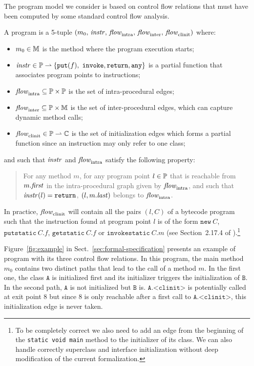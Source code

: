 \documentclass{entcs}
\newcommand{\clinit}{\ensuremath{\texttt{<clinit>}}}
\newcommand{\flow}{\mathit{flow}}
\newcommand{\intraflow}{\flow_{\rm intra}}
\newcommand{\interflow}{\flow_{\rm inter}}
\newcommand{\clinitflow}{\flow_{\rm clinit}}
\begin{document}
The program model we consider is based on control flow relations that
must have been computed by some standard control flow analysis.
\begin{definition}\sloppy
  A program is a 5-tuple
  $(m_0,\,\instrAt,\,\intraflow,\,\interflow,\,\clinitflow)$ where:
  \begin{itemize}
  \item $m_0\in\mathbb{M}$ is the method where the program execution
    starts;
  \item $\mathit{instr}\in\mathbb{P}\rightharpoonup\{\mathtt{put}(f),~\mathtt{invoke},\mathtt{return},\mathtt{any}\}$ is a
    partial function that associates program points to instructions;
  \item $\intraflow\subseteq \ppt\times\ppt$ is the set of
    intra-procedural edges;
  \item $\interflow\subseteq \ppt\times\method$ is the set of
    inter-procedural edges, which can capture dynamic method calls;
  \item $\clinitflow\in \ppt\pto\class$ is the set of initialization
    edges which forms a partial function since an instruction may only
    refer to one class;
  \end{itemize}
  and such that $\mathit{instr}$ and $\intraflow$ satisfy the following
  property:
  \begin{quote}
    For any method $m$, for any program point $l\in\mathbb{P}$ that is
    reachable from $m.\mathit{first}$ in the intra-procedural graph given by
    $\intraflow$, and such that $\mathit{instr}(l)=\mathtt{return}$, $(l,m.\mathit{last})$
    belongs to $\intraflow$.
  \end{quote}
\end{definition}
In practice, $\clinitflow$ will contain all the pairs $(l,C)$ of a
bytecode program such that the instruction found at program point $l$
is of the form $\mathtt{new}~C$, $\mathtt{putstatic}~C.f$,
$\mathtt{getstatic}~C.f$ or $\mathtt{invokestatic}~C.m$ (see
Section~2.17.4 of \cite{lindholm99:jvm_spec}).\footnote{To be completely correct we also need to add an edge from the
  beginning of the \texttt{static void main} method to the initializer
  of its class.  We can also handle correctly superclass and interface
  initialization without deep modification of the current
  formalization.}






Figure~\ref{fig:example} in Sect.~\ref{sec:formal-specification}
presents an example of program with its three control flow
relations.  In this program, the main method $m_0$ contains two
distinct paths that lead to the call of a method $m$.  In the first
one, the class $\mathtt{A}$ is initialized first and its initializer
triggers the initialization of $\mathtt{B}$.  In the second path,
$\mathtt{A}$ is not initialized but $\mathtt{B}$ is.
$\mathtt{A}.\clinit$ is potentially called at exit point $8$ but since
$8$ is only reachable after a first call to $\mathtt{A}.\clinit$, this
initialization edge is never taken.
\end{document}
